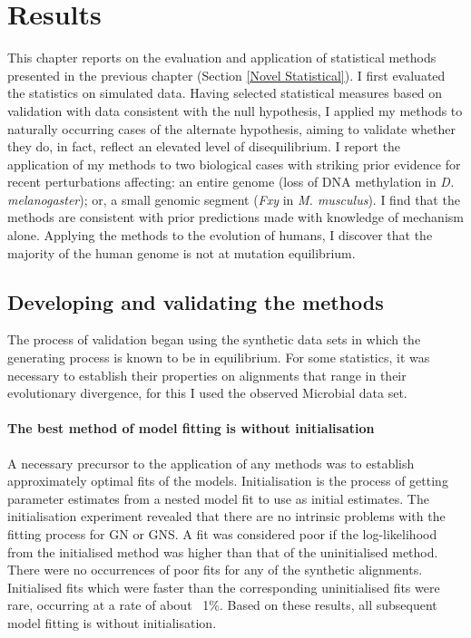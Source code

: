 \chapter{Results}

This chapter reports on the evaluation and application of statistical methods presented in the previous chapter (Section \ref{Novel Statistical}). I first evaluated the statistics on simulated data. Having selected statistical measures based on validation with data consistent with the null hypothesis, I applied my methods to naturally occurring cases of the alternate hypothesis, aiming to validate whether they do, in fact, reflect an elevated level of disequilibrium. I report the application of my methods to two biological cases with striking prior evidence for recent perturbations affecting: an entire genome (loss of DNA methylation in \textit{D. melanogaster}); or, a small genomic segment (\textit{Fxy} in \textit{M. musculus}). I find that the methods are consistent with prior predictions made with knowledge of mechanism alone. Applying the methods to the evolution of humans, I discover that the majority of the human genome is not at mutation equilibrium.

\section{Developing and validating the methods}
\label{Simulation}

The process of validation began using the synthetic data sets in which the generating process is known to be in equilibrium. For some statistics, it was necessary to establish their properties on alignments that range in their evolutionary divergence, for this I used the observed Microbial data set.  

\subsubsection{The best method of model fitting is without initialisation}

A necessary precursor to the application of any methods was to establish approximately optimal fits of the models. Initialisation is the process of getting parameter estimates from a nested model fit to use as initial estimates. The initialisation experiment revealed that there are no intrinsic problems with the fitting process for GN or GNS. A fit was considered poor if the log-likelihood from the initialised method was higher than that of the uninitialised method. There were no occurrences of poor fits for any of the synthetic alignments. Initialised fits which were faster than the corresponding uninitialised fits were rare, occurring at a rate of about ~1\%. Based on these results, all subsequent model fitting is without initialisation.


